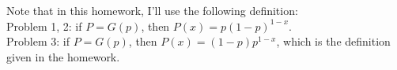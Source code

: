 Note that in this homework, I'll use the following definition:\\
Problem 1, 2: if $P=G(p)$, then $P(x)=p(1-p)^{1-x}$.\\
Problem 3: if $P=G(p)$, then $P(x)=(1-p)p^{1-x}$, which is the definition given in the homework.
